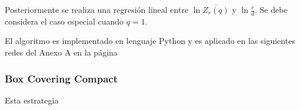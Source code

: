 Posteriormente se realiza una regresión lineal entre $\ln \overline{Z_r(q)}$ y $\ln\frac{r}{d}$. Se debe considera el caso especial cuando $q=1$.

El algoritmo es implementado en lenguaje Python y es aplicado en las siguientes redes del Anexo A en la página \pageref{AnexoA}

\subsubsection{Box Covering Compact}

Esta estrategia